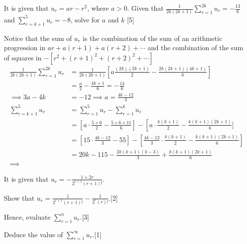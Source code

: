 \documentclass[12pt, a4 paper]{article}
\begin{document}
\begin{outline}[enumerate]
 \1 It is given that \(u_{r}=ar-r^2\), where \(a>0\). Given that \(\frac{1}{2k(2k+1)}\sum\limits_{r=1}^{2k}u_{r}=-\frac{13}{6}\) and \(\sum\limits_{r=k+1}^{5}u_{r}=-8\), solve for \(a\)  and \(k\) \hfill[5] %
\begin{answer}
  Notice that the sum of \(u_r\) is the combination of the sum of an arithmetic progression in \(ar + a(r+1) + a(r+2)+ \cdots \) and the combination of the sum of squares in \(-[r^2 + {(r+1)}^2 + {(r+2)}^2 + \cdots]\) \\
\begin{align*}
  \frac{1}{2k(2k+1)}\sum^{2k}_{r=1}u_r &= \frac{1}{2k(2k+1)}\left[a\frac{(2k)(2k+1)}{2} - \frac{2k(2k+1)(4k+1)}{6}\right] \\
  &= \frac{a}{2} - \frac{4k+1}{6} = -\frac{13}{6} \\
  \implies 3a-4k&=-12  \implies a = \frac{4k-12}{3} \\
  \sum^5_{r=k+1}u_r &= \sum^5_{r=1}u_r - \sum^k_{r=1}u_r \\
  &= \left[a\cdot\frac{5\times6}{2} - \frac{5\times6\times11}{6}\right] - \left[a\cdot\frac{k(k+1)}{2} - \frac{k(k+1)(2k+1)}{6}] \\
  &= \left[15\cdot\frac{4k-12}{3}-55\right] - \left[\frac{4k-12}{3}\cdot\frac{k(k+1)}{2} - \frac{k(k+1)(2k+1)}{6}\right] \\
  &= 20k-115-\frac{2k(k+1)(k-3)}{3}+\frac{k(k+1)(2k+1)}{6} \\
  \implies
\end{align*}
\end{answer}
 \1 It is given that \(u_{r}=-\frac{1+2r}{2^{r+1}(r+1)!}\). %

 \2 Show that \(u_{r}=\frac{1}{2^{r+1}(r+1)!}-\frac{1}{2^{r}(r)!}\).\hfill[2]

 \2 Hence, evaluate \(\sum\limits_{r=1}^{n}u_r\).\hfill[3]

 \2 Deduce the value of \(\sum\limits_{r=1}^{\infty}u_r\).\hfill[1]


\end{outline}
\end{document}
